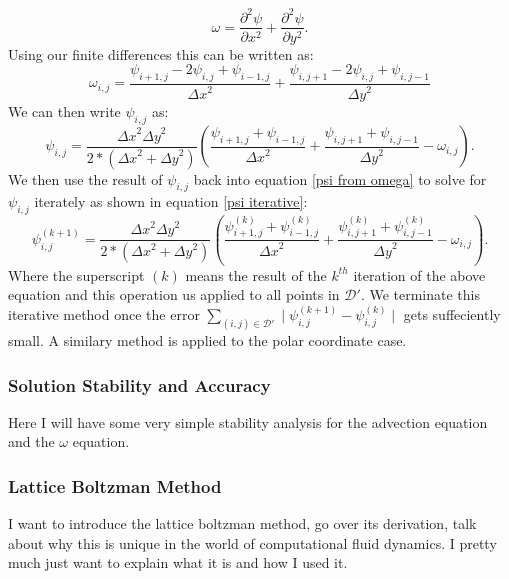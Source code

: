 \documentclass{article}
\begin{document}
\begin{equation}
	\omega = \frac{\partial^2 \psi}{\partial x^2} + \frac{\partial^2 \psi}{\partial y^2}.
\end{equation}
Using our finite differences this can be written as:
\begin{equation}
	\omega_{i,j} = \frac{\psi_{i+1,j} - 2 \psi_{i,j} + \psi_{i-1,j}  }{{\Delta x}^2} + \frac{\psi_{i,j+1} - 2 \psi_{i,j} + \psi_{i,j-1}  }{{\Delta y}^2}
	\label{psi disc}
\end{equation}
We can then write $\psi_{i,j}$ as:
\begin{equation}
	\psi_{i,j} = \frac{{\Delta x}^2 {\Delta y}^2  }{2*({\Delta x}^2  + {\Delta y}^2)} (\frac{\psi_{i+1,j} +\psi_{i-1,j} }{{\Delta x}^2} + \frac{\psi_{i,j+1} +\psi_{i,j-1}  }{{\Delta y}^2 }   - \omega_{i,j}).
	\label{psi from omega}
\end{equation}
We then use the result of $\psi_{i,j}$ back into equation \ref{psi from omega} to solve for $\psi_{i,j}$ iterately as shown in equation \ref{psi iterative}:
\begin{equation}
	\psi_{i,j}^{(k+1)} = \frac{{\Delta x}^2 {\Delta y}^2  }{2*({\Delta x}^2  + {\Delta y}^2)} (\frac{\psi_{i+1,j}^{(k)} +\psi_{i-1,j}^{(k)}  }{{\Delta x}^2} + \frac{\psi_{i,j+1}^{(k)} +\psi_{i,j-1}^{(k)}  }{{\Delta y}^2 }   - \omega_{i,j}).
	\label{psi iterative}
\end{equation}
Where the superscript $(k)$ means the result of the $k^{th}$ iteration of the above equation and this operation us applied to all points in $\mathcal{D}'$.
 We terminate this iterative method once the error $\sum_{(i,j) \in \mathcal{D'}} \mid \psi_{i,j}^{(k+1)} - \psi_{i,j}^{(k)} \mid$ gets suffeciently small. A similary method is applied to the polar coordinate case. 

\subsubsection*{Solution Stability and Accuracy}
Here I will have some very simple stability analysis
for the advection equation and the $\omega$ equation.


\subsubsection*{Lattice Boltzman Method}
I want to introduce the lattice boltzman method, go over its derivation, talk about why this is unique 
in the world of computational fluid dynamics. I pretty much just want to explain what it is and how I used it.
\end{document}
